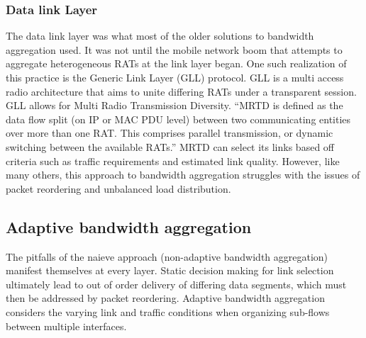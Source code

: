 \documentclass[12pt]{article}
\begin{document}
	\subsubsection{Data link Layer}
		The data link layer was what most of the older solutions to bandwidth aggregation used. It was not until the mobile network boom that attempts to aggregate heterogeneous RATs at the link layer began. One such realization of this practice is the Generic Link Layer (GLL) protocol. GLL is a multi access radio architecture that aims to unite differing RATs under a transparent session. GLL allows for Multi Radio Transmission Diversity.
		 ``MRTD is defined as the data flow split (on IP or MAC PDU level) between two communicating entities over more than one RAT. This comprises parallel transmission, or dynamic switching between the available RATs.''\cite{GLL:2005}
		MRTD can select its links based off criteria such as traffic requirements and estimated link quality. However, like many others, this approach to bandwidth aggregation struggles with the issues of packet reordering and unbalanced load distribution.

\subsection{Adaptive bandwidth aggregation}
	The pitfalls of the naieve approach (non-adaptive bandwidth aggregation) manifest themselves at every layer. Static decision making for link selection ultimately lead to out of order delivery of differing data segments, which must then be addressed by packet reordering. Adaptive bandwidth aggregation considers the varying link and traffic conditions when organizing sub-flows between multiple interfaces.
\end{document}
